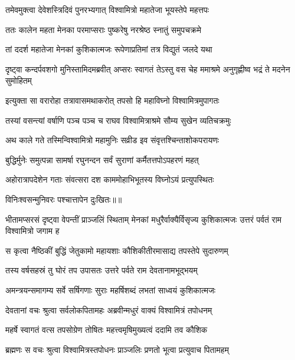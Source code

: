 \twolineshloka
{तमेवमुक्त्वा देवेशस्त्रिदिवं पुनरभ्यगात्}
{विश्वामित्रो महातेजा भूयस्तेपे महत्तपः} %

\twolineshloka
{ततः कालेन महता मेनका परमाप्सराः}
{पुष्करेषु नरश्रेष्ठ स्नातुं समुपचक्रमे} %

\twolineshloka
{तां ददर्श महातेजा मेनकां कुशिकात्मजः}
{रूपेणाप्रतिमां तत्र विद्युतं जलदे यथा} %

\threelineshloka
{दृष्ट्वा कन्दर्पवशगो मुनिस्तामिदमब्रवीत्}
{अप्सरः स्वागतं तेऽस्तु वस चेह ममाश्रमे}
{अनुगृह्णीष्व भद्रं ते मदनेन सुमोहितम्} %

\twolineshloka
{इत्युक्ता सा वरारोहा तत्रावासमथाकरोत्}
{तपसो हि महाविघ्नो विश्वामित्रमुपागतः} %

\twolineshloka
{तस्यां वसन्त्यां वर्षाणि पञ्च पञ्च च राघव}
{विश्वामित्राश्रमे सौम्य सुखेन व्यतिचक्रमुः} %

\twolineshloka
{अथ काले गते तस्मिन्विश्वामित्रो महामुनिः}
{सव्रीड इव संवृत्तश्चिन्ताशोकपरायणः} %

\twolineshloka
{बुद्धिर्मुनेः समुत्पन्ना सामर्षा रघुनन्दन}
{सर्वं सुराणां कर्मैतत्तपोऽपहरणं महत्} %

\twolineshloka
{अहोरात्रापदेशेन गताः संवत्सरा दश}
{काममोहाभिभूतस्य विघ्नोऽयं प्रत्युपस्थितः} %

{विनिःश्वसन्मुनिवरः पश्चात्तापेन दुःखितः॥॥} %

\addtocounter{shlokacount}{1}

\threelineshloka
{भीतामप्सरसं दृष्ट्वा वेपन्तीं प्राञ्जलिं स्थिताम्}
{मेनकां मधुरैर्वाक्यैर्विसृज्य कुशिकात्मजः}
{उत्तरं पर्वतं राम विश्वामित्रो जगाम ह} %

\twolineshloka
{स कृत्वा नैष्ठिकीं बुद्धिं जेतुकामो महायशाः}
{कौशिकीतीरमासाद्य तपस्तेपे सुदारुणम्} %

\twolineshloka
{तस्य वर्षसहस्रं तु घोरं तप उपासतः}
{उत्तरे पर्वते राम देवतानामभूद्भयम्} %

\twolineshloka
{अमन्त्रयन्समागम्य सर्वे सर्षिगणाः सुराः}
{महर्षिशब्दं लभतां साध्वयं कुशिकात्मजः} %

\twolineshloka
{देवतानां वचः श्रुत्वा सर्वलोकपितामहः}
{अब्रवीन्मधुरं वाक्यं विश्वामित्रं तपोधनम्} %

\twolineshloka
{महर्षे स्वागतं वत्स तपसोग्रेण तोषितः}
{महत्त्वमृषिमुख्यत्वं ददामि तव कौशिक} %

\twolineshloka
{ब्रह्मणः स वचः श्रुत्वा विश्वामित्रस्तपोधनः}
{प्राञ्जलिः प्रणतो भूत्वा प्रत्युवाच पितामहम्} %

